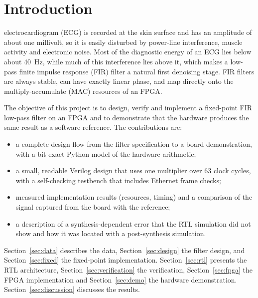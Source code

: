 \documentclass{ieeeaccess}
\begin{document}
\titlepgskip=-15pt

\maketitle

\section{Introduction}
\label{sec:introduction}
 electrocardiogram (ECG) is recorded at the skin surface and has an amplitude of about one millivolt, so it is easily disturbed by power-line interference, muscle activity and electronic noise. Most of the diagnostic energy of an ECG lies below about 40~Hz, while much of this interference lies above it, which makes a low-pass finite impulse response (FIR) filter a natural first denoising stage. FIR filters are always stable, can have exactly linear phase, and map directly onto the multiply-accumulate (MAC) resources of an FPGA.

The objective of this project is to design, verify and implement a fixed-point FIR low-pass filter on an FPGA and to demonstrate that the hardware produces the same result as a software reference. The contributions are:
\begin{itemize}
\item a complete design flow from the filter specification to a board demonstration, with a bit-exact Python model of the hardware arithmetic;
\item a small, readable Verilog design that uses one multiplier over 63 clock cycles, with a self-checking testbench that includes Ethernet frame checks;
\item measured implementation results (resources, timing) and a comparison of the signal captured from the board with the reference;
\item a description of a synthesis-dependent error that the RTL simulation did not show and how it was located with a post-synthesis simulation.
\end{itemize}

Section~\ref{sec:data} describes the data, Section~\ref{sec:design} the filter design, and Section~\ref{sec:fixed} the fixed-point implementation. Section~\ref{sec:rtl} presents the RTL architecture, Section~\ref{sec:verification} the verification, Section~\ref{sec:fpga} the FPGA implementation and Section~\ref{sec:demo} the hardware demonstration. Section~\ref{sec:discussion} discusses the results.
\end{document}

